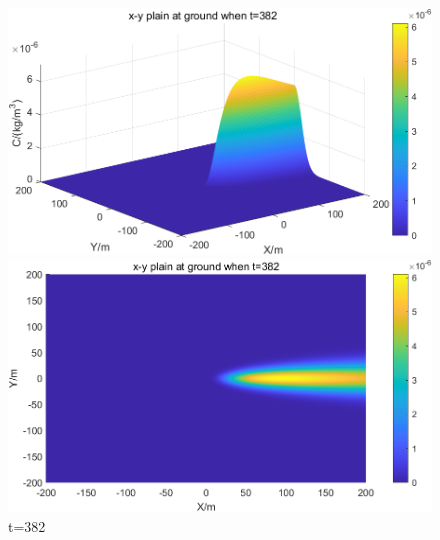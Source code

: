\documentclass{article}
\begin{document}
	\begin{figure}[htbp]
		\begin{minipage}{0.49\textwidth}
			\includegraphics[width=\textwidth]{pics/default,t=382,3D.png}
		\end{minipage}
		\begin{minipage}{0.49\textwidth}
			\includegraphics[width=\textwidth]{pics/default,t=382,2D.png}
		\end{minipage}
		\caption{t=382}
		\label{fig8}
	\end{figure}
\end{document}
